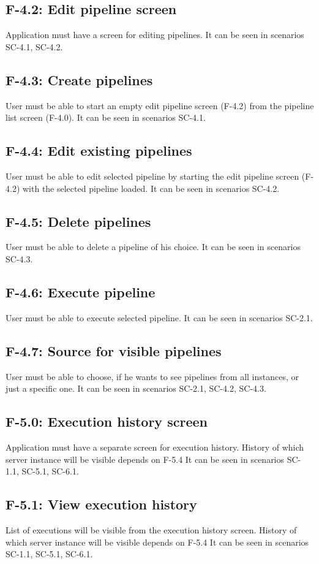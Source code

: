 \subsection*{F-4.2: Edit pipeline screen}
\label{subsec:editpipelinescreen}
Application must have a screen for editing pipelines. It can be seen in scenarios SC-4.1, SC-4.2.
\subsection*{F-4.3: Create pipelines}
User must be able to start an empty edit pipeline screen (F-4.2) from the pipeline list screen (F-4.0). It can be seen in scenarios SC-4.1.
\subsection*{F-4.4: Edit existing pipelines}
User must be able to edit selected pipeline by starting the edit pipeline screen (F-4.2) with the selected pipeline loaded. It can be seen in scenarios SC-4.2.
\subsection*{F-4.5: Delete pipelines}
User must be able to delete a pipeline of his choice. It can be seen in scenarios SC-4.3.
\subsection*{F-4.6: Execute pipeline}
User must be able to execute selected pipeline. It can be seen in scenarios SC-2.1.
\subsection*{F-4.7: Source for visible pipelines}
User must be able to choose, if he wants to see pipelines from all instances, or just a specific one. It can be seen in scenarios SC-2.1, SC-4.2, SC-4.3.
\subsection*{F-5.0: Execution history screen}
Application must have a separate screen for execution history. History of which server instance will be visible depends on F-5.4 It can be seen in scenarios SC-1.1, SC-5.1, SC-6.1.
\subsection*{F-5.1: View execution history}
List of executions will be visible from the execution history screen. History of which server instance will be visible depends on F-5.4 It can be seen in scenarios SC-1.1, SC-5.1, SC-6.1.
